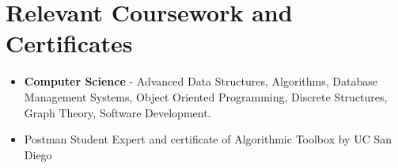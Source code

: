 \documentclass[letterpaper,11pt]{article}
\newcommand{\resumeItem}[1]{
  \item\small{
    {#1 \vspace{-2pt}}
  }
}
\newcommand{\resumeSubHeadingListStart}{\begin{itemize}[leftmargin=0.0in, label={}]}
\newcommand{\resumeSubHeadingListEnd}{\end{itemize}}
\newcommand{\resumeItemListStart}{\begin{itemize}}
\newcommand{\resumeItemListEnd}{\end{itemize}\vspace{-5pt}}
\begin{document}
    
\section{Relevant Coursework and Certificates}

 \resumeSubHeadingListStart
        \resumeItemListStart
            \resumeItem{
            \textbf{Computer Science} - Advanced Data Structures, Algorithms, Database Management Systems, Object Oriented Programming, Discrete Structures, Graph Theory, Software Development.
            }
            \resumeItem{
            Postman Student Expert and certificate of Algorithmic Toolbox by UC San Diego
            }
        \resumeItemListEnd
        
    \resumeSubHeadingListEnd
\end{document}
